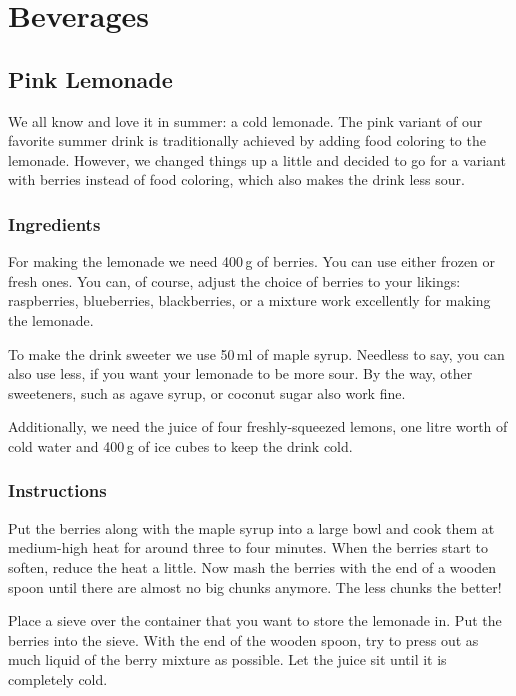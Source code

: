 	
% 
	
\section{Beverages}
	
\subsection{Pink Lemonade}
We all know and love it in summer: a cold lemonade. The pink variant of our 
favorite summer drink is traditionally achieved by adding food coloring to the 
lemonade. However, we changed things up a little and decided to go for a 
variant with berries instead of food coloring, which also makes the drink less 
sour.
	
\subsubsection{Ingredients}
For making the lemonade we need 400\,g of berries. You can use either frozen or 
fresh ones. You can, of course, adjust the choice of berries to your likings: 
raspberries, blueberries, blackberries, or a mixture work excellently for 
making the lemonade.

To make the drink sweeter we use 50\,ml of maple syrup. Needless to say, you 
can also use less, if you want your lemonade to be more sour. By the way, other 
sweeteners, such as agave syrup, or coconut sugar also work fine.

Additionally, we need the juice of four freshly-squeezed lemons, one litre 
worth of cold water and 400\,g of ice cubes to keep the drink cold.
	
\subsubsection{Instructions}
Put the berries along with the maple syrup into a large bowl and cook them at 
medium-high heat for around three to four minutes. When the berries start to 
soften, reduce the heat a little. Now mash the berries with the end of a wooden 
spoon until there are almost no big chunks anymore. The less chunks the better!
	
Place a sieve over the container that you want to store the lemonade in. Put 
the berries into the sieve. With the end of the wooden spoon, try to press out 
as much liquid of the berry mixture as possible. Let the juice sit until it is 
completely cold.
	
